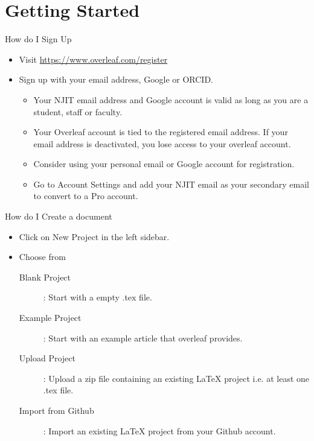\documentclass[style=njit,orient=landscape]{powerdot}
\begin{document}
\section[slide=false]{Getting Started}

\begin{slide}{How do I Sign Up}
\begin{itemize}
    \item Visit \url{https://www.overleaf.com/register}
    \item Sign up with your email address, Google or ORCID.
    \begin{itemize}
        \item Your NJIT email address and Google account is valid as long as you are a student, staff or faculty.
        \item Your Overleaf account is tied to the registered email address. If your email address is deactivated, you lose access to your overleaf account.
        \item Consider using your personal email or Google account for registration.
        \item Go to Account Settings and add your NJIT email as your secondary email to convert to a Pro account.
    \end{itemize}
\end{itemize}
\end{slide}

\begin{slide}{How do I Create a document}
    \begin{itemize}
        \item Click on New Project in the left sidebar.
        \item Choose from 
        \begin{description}
            \item[Blank Project]: Start with a empty .tex file.
            \item[Example Project]: Start with an example article that overleaf provides.
            \item[Upload Project]: Upload a zip file containing an existing \LaTeX{} project i.e. at least one .tex file.
            \item[Import from Github]: Import an existing \LaTeX{} project from your Github account.
        \end{description}
    \end{itemize}
\end{slide}
\end{document}
